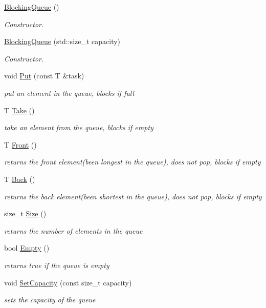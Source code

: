 \begin{DoxyCompactItemize}
\item 
\hyperlink{classBlockingQueue_a42f821a61ba22ba27e6d1a434ab27eb2}{Blocking\+Queue} ()
\begin{DoxyCompactList}\small\item\em Constructor. \end{DoxyCompactList}\item 
\hyperlink{classBlockingQueue_adfb84eb73f882a364c8f4cb325b22a1a}{Blocking\+Queue} (std\+::size\+\_\+t capacity)
\begin{DoxyCompactList}\small\item\em Constructor. \end{DoxyCompactList}\item 
void \hyperlink{classBlockingQueue_aeda6a5448ed9b96a56fa1143e6e8ad1c}{Put} (const T \&task)
\begin{DoxyCompactList}\small\item\em put an element in the queue, blocks if full \end{DoxyCompactList}\item 
T \hyperlink{classBlockingQueue_a38dd122eba62f8b5d7ddc1aae266e8da}{Take} ()
\begin{DoxyCompactList}\small\item\em take an element from the queue, blocks if empty \end{DoxyCompactList}\item 
T \hyperlink{classBlockingQueue_a1890f7159b58b97ca1cade42bce9e982}{Front} ()
\begin{DoxyCompactList}\small\item\em returns the front element(been longest in the queue), does not pop, blocks if empty \end{DoxyCompactList}\item 
T \hyperlink{classBlockingQueue_ad2e79734669baee7eeb90e43e9e5d6b9}{Back} ()
\begin{DoxyCompactList}\small\item\em returns the back element(been shortest in the queue), does not pop, blocks if empty \end{DoxyCompactList}\item 
size\+\_\+t \hyperlink{classBlockingQueue_acf02cc9e5671442f6f66c156d9cbe431}{Size} ()
\begin{DoxyCompactList}\small\item\em returns the number of elements in the queue \end{DoxyCompactList}\item 
bool \hyperlink{classBlockingQueue_ae7884eb98569730e5cea0e443d5bb661}{Empty} ()
\begin{DoxyCompactList}\small\item\em returns true if the queue is empty \end{DoxyCompactList}\item 
void \hyperlink{classBlockingQueue_ab3d6fd8cc72986de54213ebdef01245d}{Set\+Capacity} (const size\+\_\+t capacity)
\begin{DoxyCompactList}\small\item\em sets the capacity of the queue \end{DoxyCompactList}\end{DoxyCompactItemize}
